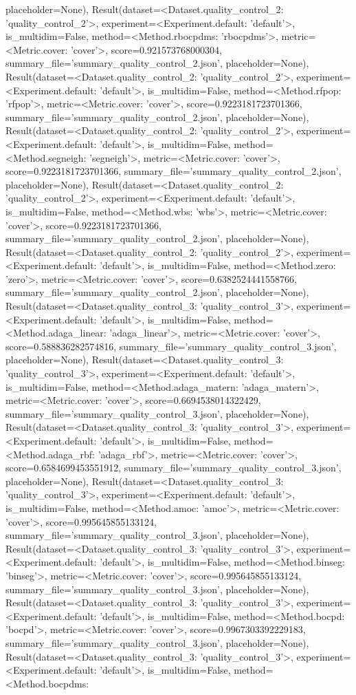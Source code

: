 placeholder=None), Result(dataset=<Dataset.quality_control_2: 'quality_control_2'>, experiment=<Experiment.default: 'default'>, is_multidim=False, method=<Method.rbocpdms: 'rbocpdms'>, metric=<Metric.cover: 'cover'>, score=0.921573768000304, summary_file='summary_quality_control_2.json', placeholder=None), Result(dataset=<Dataset.quality_control_2: 'quality_control_2'>, experiment=<Experiment.default: 'default'>, is_multidim=False, method=<Method.rfpop: 'rfpop'>, metric=<Metric.cover: 'cover'>, score=0.9223181723701366, summary_file='summary_quality_control_2.json', placeholder=None), Result(dataset=<Dataset.quality_control_2: 'quality_control_2'>, experiment=<Experiment.default: 'default'>, is_multidim=False, method=<Method.segneigh: 'segneigh'>, metric=<Metric.cover: 'cover'>, score=0.9223181723701366, summary_file='summary_quality_control_2.json', placeholder=None), Result(dataset=<Dataset.quality_control_2: 'quality_control_2'>, experiment=<Experiment.default: 'default'>, is_multidim=False, method=<Method.wbs: 'wbs'>, metric=<Metric.cover: 'cover'>, score=0.9223181723701366, summary_file='summary_quality_control_2.json', placeholder=None), Result(dataset=<Dataset.quality_control_2: 'quality_control_2'>, experiment=<Experiment.default: 'default'>, is_multidim=False, method=<Method.zero: 'zero'>, metric=<Metric.cover: 'cover'>, score=0.6382524441558766, summary_file='summary_quality_control_2.json', placeholder=None), Result(dataset=<Dataset.quality_control_3: 'quality_control_3'>, experiment=<Experiment.default: 'default'>, is_multidim=False, method=<Method.adaga_linear: 'adaga_linear'>, metric=<Metric.cover: 'cover'>, score=0.588836282574816, summary_file='summary_quality_control_3.json', placeholder=None), Result(dataset=<Dataset.quality_control_3: 'quality_control_3'>, experiment=<Experiment.default: 'default'>, is_multidim=False, method=<Method.adaga_matern: 'adaga_matern'>, metric=<Metric.cover: 'cover'>, score=0.6694538014322429, summary_file='summary_quality_control_3.json', placeholder=None), Result(dataset=<Dataset.quality_control_3: 'quality_control_3'>, experiment=<Experiment.default: 'default'>, is_multidim=False, method=<Method.adaga_rbf: 'adaga_rbf'>, metric=<Metric.cover: 'cover'>, score=0.6584699453551912, summary_file='summary_quality_control_3.json', placeholder=None), Result(dataset=<Dataset.quality_control_3: 'quality_control_3'>, experiment=<Experiment.default: 'default'>, is_multidim=False, method=<Method.amoc: 'amoc'>, metric=<Metric.cover: 'cover'>, score=0.995645855133124, summary_file='summary_quality_control_3.json', placeholder=None), Result(dataset=<Dataset.quality_control_3: 'quality_control_3'>, experiment=<Experiment.default: 'default'>, is_multidim=False, method=<Method.binseg: 'binseg'>, metric=<Metric.cover: 'cover'>, score=0.995645855133124, summary_file='summary_quality_control_3.json', placeholder=None), Result(dataset=<Dataset.quality_control_3: 'quality_control_3'>, experiment=<Experiment.default: 'default'>, is_multidim=False, method=<Method.bocpd: 'bocpd'>, metric=<Metric.cover: 'cover'>, score=0.9967303392229183, summary_file='summary_quality_control_3.json', placeholder=None), Result(dataset=<Dataset.quality_control_3: 'quality_control_3'>, experiment=<Experiment.default: 'default'>, is_multidim=False, method=<Method.bocpdms: 